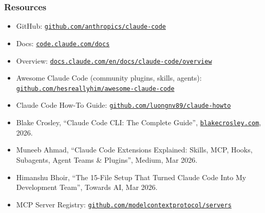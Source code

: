\begin{frame}[fragile]\frametitle{Resources}
  \begin{itemize}
    \item GitHub: \href{https://github.com/anthropics/claude-code}{\texttt{github.com/anthropics/claude-code}}
    \item Docs: \href{https://code.claude.com/docs}{\texttt{code.claude.com/docs}}
    \item Overview: \href{https://docs.claude.com/en/docs/claude-code/overview}{\texttt{docs.claude.com/en/docs/claude-code/overview}}
    \item Awesome Claude Code (community plugins, skills, agents): \href{https://github.com/hesreallyhim/awesome-claude-code}{\texttt{github.com/hesreallyhim/awesome-claude-code}}
    \item Claude Code How-To Guide: \href{https://github.com/luongnv89/claude-howto}{\texttt{github.com/luongnv89/claude-howto}}
    \item Blake Crosley, ``Claude Code CLI: The Complete Guide'', \href{https://blakecrosley.com/guides/claude-code}{\texttt{blakecrosley.com}}, 2026.
    \item Muneeb Ahmad, ``Claude Code Extensions Explained: Skills, MCP, Hooks, Subagents, Agent Teams \& Plugins'', Medium, Mar 2026.
    \item Himanshu Bhoir, ``The 15-File Setup That Turned Claude Code Into My Development Team'', Towards AI, Mar 2026.
    \item MCP Server Registry: \href{https://github.com/modelcontextprotocol/servers}{\texttt{github.com/modelcontextprotocol/servers}}
  \end{itemize}
\end{frame}
